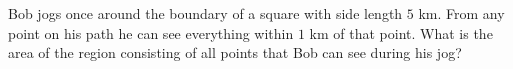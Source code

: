Bob jogs once around the boundary of a square with side length $5$ km. From any point on his path he can see everything within $1$ km of that point. What is the area of the region consisting of all points that Bob can see during his jog?
